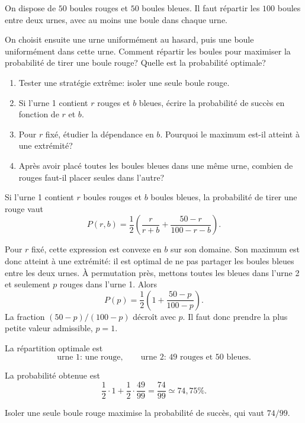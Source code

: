 \documentclass[11pt,a4paper]{article}
\begin{document}

\begin{statementbox}
On dispose de $50$ boules rouges et $50$ boules bleues. Il faut répartir les
$100$ boules entre deux urnes, avec au moins une boule dans chaque urne.

On choisit ensuite une urne uniformément au hasard, puis une boule uniformément
dans cette urne. Comment répartir les boules pour maximiser la probabilité de
tirer une boule rouge? Quelle est la probabilité optimale?
\end{statementbox}

\begin{hintsbox}
\begin{enumerate}
  \item Tester une stratégie extrême: isoler une seule boule rouge.
  \item Si l'urne 1 contient $r$ rouges et $b$ bleues, écrire la probabilité
  de succès en fonction de $r$ et $b$.
  \item Pour $r$ fixé, étudier la dépendance en $b$. Pourquoi le maximum est-il
  atteint à une extrémité?
  \item Après avoir placé toutes les boules bleues dans une même urne, combien
  de rouges faut-il placer seules dans l'autre?
\end{enumerate}
\end{hintsbox}

\correction

Si l'urne 1 contient $r$ boules rouges et $b$ boules bleues, la probabilité
de tirer une rouge vaut
\[
P(r,b)=\frac12\left(
\frac r{r+b}+\frac{50-r}{100-r-b}
\right).
\]

Pour $r$ fixé, cette expression est convexe en $b$ sur son domaine. Son
maximum est donc atteint à une extrémité: il est optimal de ne pas partager
les boules bleues entre les deux urnes. À permutation près, mettons toutes les
bleues dans l'urne 2 et seulement $p$ rouges dans l'urne 1. Alors
\[
P(p)=\frac12\left(1+\frac{50-p}{100-p}\right).
\]
La fraction $(50-p)/(100-p)$ décroît avec $p$. Il faut donc prendre la plus
petite valeur admissible, $p=1$.

\begin{keyideabox}
La répartition optimale est
\[
\text{urne 1: une rouge},
\qquad
\text{urne 2: 49 rouges et 50 bleues}.
\]
\end{keyideabox}

La probabilité obtenue est
\[
\frac12\cdot1+\frac12\cdot\frac{49}{99}
=\boxed{\frac{74}{99}\simeq74{,}75\%}.
\]

\begin{resultbox}
Isoler une seule boule rouge maximise la probabilité de succès, qui vaut
$74/99$.
\end{resultbox}
\end{document}
